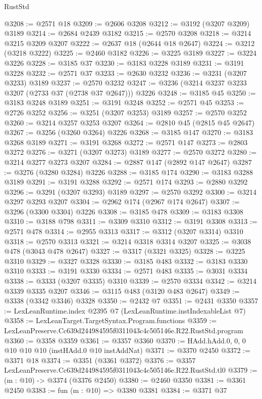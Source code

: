 \begin{lexlean}{RustStd}
\begin{coremodule}
@3208 := @2571 @18
@3209 := @2606 @3208
@3212 := @3192 (@3207 @3209) @3189
@3214 := @2684 @2439 @3182
@3215 := @2570 @3208
@3218 := @3214 @3215 @3209 @3207
@3222 := @2637 @18 (@2644 @18 @2647)
@3224 := @3212 (@3218 @3222)
@3225 := @2460 @3182
@3226 := @3225 @3189
@3227 := @3224 @3226
@3228 := @3185 @37
@3230 := @3183 @3228 @3189
@3231 := @3191 @3228
@3232 := @2571 @37
@3233 := @2630 @3232
@3236 := @3231 (@3207 @3233) @3189
@3237 := @2570 @3232
@3247 := @3236 (@3214 @3237 @3233 @3207 (@2733 @37 (@2738 @37 @2647))) @3226
@3248 := @3185 @45
@3250 := @3183 @3248 @3189
@3251 := @3191 @3248
@3252 := @2571 @45
@3253 := @2726 @3252
@3256 := @3251 (@3207 @3253) @3189
@3257 := @2570 @3252
@3260 := @3214 @3257 @3253 @3207
@3264 := @2810 @45 (@2815 @45 @2647)
@3267 := @3256 (@3260 @3264) @3226
@3268 := @3185 @147
@3270 := @3183 @3268 @3189
@3271 := @3191 @3268
@3272 := @2571 @147
@3273 := @2803 @3272
@3276 := @3271 (@3207 @3273) @3189
@3277 := @2570 @3272
@3280 := @3214 @3277 @3273 @3207
@3284 := @2887 @147 (@2892 @147 @2647)
@3287 := @3276 (@3280 @3284) @3226
@3288 := @3185 @174
@3290 := @3183 @3288 @3189
@3291 := @3191 @3288
@3292 := @2571 @174
@3293 := @2880 @3292
@3296 := @3291 (@3207 @3293) @3189
@3297 := @2570 @3292
@3300 := @3214 @3297 @3293 @3207
@3304 := @2962 @174 (@2967 @174 @2647)
@3307 := @3296 (@3300 @3304) @3226
@3308 := @3185 @478
@3309 := @3183 @3308
@3310 := @3188 @798
@3311 := @3309 @3310
@3312 := @3191 @3308
@3313 := @2571 @478
@3314 := @2955 @3313
@3317 := @3312 (@3207 @3314) @3310
@3318 := @2570 @3313
@3321 := @3214 @3318 @3314 @3207
@3325 := @3038 @478 (@3043 @478 @2647)
@3327 := @3317 (@3321 @3325)
@3328 := @3225 @3310
@3329 := @3327 @3328
@3330 := @3185 @483
@3332 := @3183 @3330 @3310
@3333 := @3191 @3330
@3334 := @2571 @483
@3335 := @3031 @3334
@3338 := @3333 (@3207 @3335) @3310
@3339 := @2570 @3334
@3342 := @3214 @3339 @3335 @3207
@3346 := @3115 @483 (@3120 @483 @2647)
@3349 := @3338 (@3342 @3346) @3328
@3350 := @2432 @7
@3351 := @2431 @3350
@3357 := LexLeanRuntime.index @2395 @7 (LexLeanRuntime.instIndexableList @7)
@3358 := LexLeanTarget.TargetSyntax.Program.functions
@3359 := LexLeanPreserve.Cc639d244984595f0311043c4c505146e.R22.RustStd.program
@3360 := @3358 @3359
@3361 := @3357 @3360
@3370 := HAdd.hAdd.{0, 0, 0} @10 @10 @10 (instHAdd.{0} @10 instAddNat)
@3371 := @3370 @2450
@3372 := @3371 @18
@3374 := @3351 (@3361 @3372)
@3376 := @3357 LexLeanPreserve.Cc639d244984595f0311043c4c505146e.R22.RustStd.tl0
@3379 := (m : @10) -> @3374 (@3376 @2450)
@3380 := @2460 @3350
@3381 := @3361 @2450
@3383 := fun (m : @10) => @3380 @3381
@3384 := @3371 @37

\end{coremodule}
\end{lexlean}
